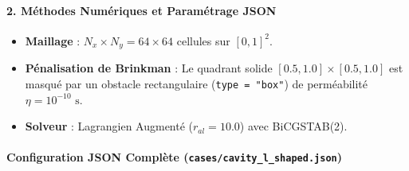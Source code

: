\documentclass[
  10pt,
]{article}
\providecommand{\tightlist}{%
  \setlength{\itemsep}{0pt}\setlength{\parskip}{0pt}}
\begin{document}
\paragraph{2. Méthodes Numériques et Paramétrage
JSON}\label{muxe9thodes-numuxe9riques-et-paramuxe9trage-json-4}

\begin{itemize}
\tightlist
\item
  \textbf{Maillage} : \(N_x \times N_y = 64 \times 64\) cellules sur
  \([0, 1]^2\).
\item
  \textbf{Pénalisation de Brinkman} : Le quadrant solide
  \([0.5, 1.0] \times [0.5, 1.0]\) est masqué par un obstacle
  rectangulaire (\texttt{type\ =\ "box"}) de perméabilité
  \(\eta = 10^{-10}\text{ s}\).
\item
  \textbf{Solveur} : Lagrangien Augmenté (\(r_{al} = 10.0\)) avec
  BiCGSTAB(2).
\end{itemize}

\paragraph{\texorpdfstring{Configuration JSON Complète
(\texttt{cases/cavity\_l\_shaped.json})}{Configuration JSON Complète (cases/cavity\_l\_shaped.json)}}\label{configuration-json-compluxe8te-casescavity_l_shaped.json}
\end{document}
